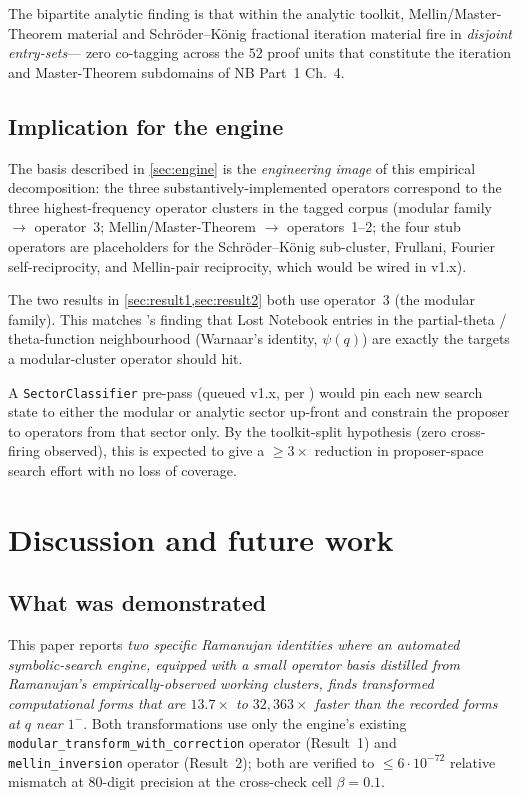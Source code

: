 \documentclass[11pt,reqno]{amsart}
\theoremstyle{definition}
\begin{document}
The bipartite analytic finding \cite[diary~36;
BIG\_IDEAS\_REVIEW \S 2c]{ProjectC} is that within the analytic
toolkit, Mellin/Master-Theorem material and Schr\"oder--K\"onig
fractional iteration material fire in \emph{disjoint entry-sets}---
zero co-tagging across the $52$ proof units that constitute the
iteration and Master-Theorem subdomains of NB Part~1 Ch.~4.

\subsection{Implication for the engine}\label{sec:toolkitsplit-implication}

The basis described in \cref{sec:engine} is the \emph{engineering
image} of this empirical decomposition: the three
substantively-implemented operators correspond to the three
highest-frequency operator clusters in the tagged corpus (modular
family $\to$ operator~3; Mellin/Master-Theorem $\to$ operators~1--2;
the four stub operators are placeholders for the Schr\"oder--K\"onig
sub-cluster, Frullani, Fourier self-reciprocity, and Mellin-pair
reciprocity, which would be wired in v1.x).

The two results in \cref{sec:result1,sec:result2} both use
operator~3 (the modular family). This matches
\cite[diary~36]{ProjectC}'s finding that Lost Notebook entries in
the partial-theta / theta-function neighbourhood (Warnaar's
identity, $\psi(q)$) are exactly the targets a modular-cluster
operator should hit.

A \verb|SectorClassifier| pre-pass (queued v1.x, per
\cite[diary~38]{ProjectC}) would pin each new search state to either
the modular or analytic sector up-front and constrain the proposer
to operators from that sector only. By the toolkit-split hypothesis
(zero cross-firing observed), this is expected to give a
$\ge 3\times$ reduction in proposer-space search effort with no loss
of coverage.

\section{Discussion and future work}\label{sec:discussion}

\subsection{What was demonstrated}

This paper reports \emph{two specific Ramanujan identities where an
automated symbolic-search engine, equipped with a small operator
basis distilled from Ramanujan's empirically-observed working
clusters, finds transformed computational forms that are
$13.7\times$ to $32{,}363\times$ faster than the recorded forms at
$q$ near $1^-$}. Both transformations use only the engine's existing
\verb|modular_transform_with_correction| operator (Result~1) and
\verb|mellin_inversion| operator (Result~2); both are verified to
$\le 6 \cdot 10^{-72}$ relative mismatch at $80$-digit precision at
the cross-check cell $\beta = 0.1$.
\end{document}
